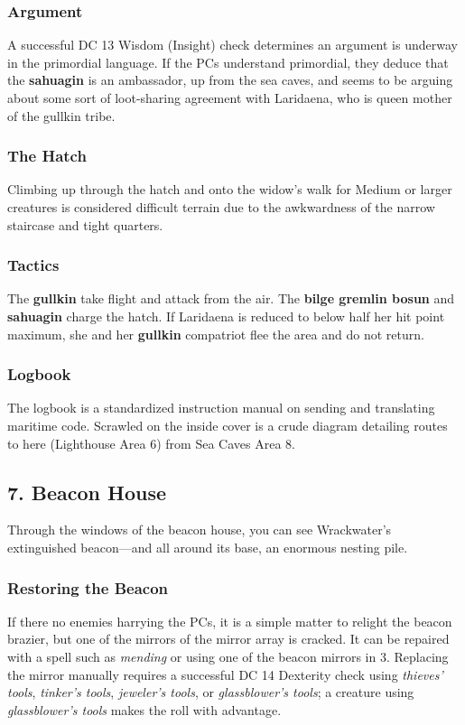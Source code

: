 \documentclass[10pt,a4paper,twoside,bg=print,twocolumn,openany,nodeprecatedcode]{dndbook}
\begin{document}
\subsubsection{Argument}
A successful DC 13 Wisdom (Insight) check determines an argument is underway in the primordial language. If the PCs understand primordial, they deduce that the \textbf{sahuagin} is an ambassador, up from the sea caves, and seems to be arguing about some sort of loot-sharing agreement with Laridaena, who is queen mother of the gullkin tribe.

\subsubsection{The Hatch}
Climbing up through the hatch and onto the widow's walk for Medium or larger creatures is considered difficult terrain due to the awkwardness of the narrow staircase and tight quarters.

\subsubsection{Tactics}
The \textbf{gullkin} take flight and attack from the air. The \textbf{bilge gremlin bosun} and \textbf{sahuagin} charge the hatch. If Laridaena is reduced to below half her hit point maximum, she and her \textbf{gullkin} compatriot flee the area and do not return.

\subsubsection{Logbook}
The logbook is a standardized instruction manual on sending and translating maritime code. Scrawled on the inside cover is a crude diagram detailing routes to here (Lighthouse Area 6) from Sea Caves Area 8.

\subsection{7. Beacon House}
\begin{DndReadAloud}{}
Through the windows of the beacon house, you can see Wrackwater's extinguished beacon—and all around its base, an enormous nesting pile.

\end{DndReadAloud}

\subsubsection{Restoring the Beacon}
If there no enemies harrying the PCs, it is a simple matter to relight the beacon brazier, but one of the mirrors of the mirror array is cracked. It can be repaired with a spell such as \textit{mending} or using one of the beacon mirrors in 3. Replacing the mirror manually requires a successful DC 14 Dexterity check using \textit{thieves' tools}, \textit{tinker's tools}, \textit{jeweler's tools}, or \textit{glassblower's tools}; a creature using \textit{glassblower's tools} makes the roll with advantage.
\end{document}

